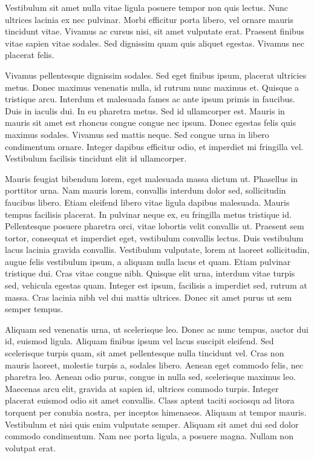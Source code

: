 \documentclass[a4paper,10pt,twoside]{article} %
\begin{document}
Vestibulum sit amet nulla vitae ligula posuere tempor non quis lectus.
Nunc ultrices lacinia ex nec pulvinar.
Morbi efficitur porta libero, vel ornare mauris tincidunt vitae.
Vivamus ac cursus nisi, sit amet vulputate erat.
Praesent finibus vitae sapien vitae sodales.
Sed dignissim quam quis aliquet egestas.
Vivamus nec placerat felis.

Vivamus pellentesque dignissim sodales.
Sed eget finibus ipsum, placerat ultricies metus.
Donec maximus venenatis nulla, id rutrum nunc maximus et.
Quisque a tristique arcu.
Interdum et malesuada fames ac ante ipsum primis in faucibus.
Duis in iaculis dui.
In eu pharetra metus.
Sed id ullamcorper est.
Mauris in mauris sit amet est rhoncus congue congue nec ipsum.
Donec egestas felis quis maximus sodales.
Vivamus sed mattis neque.
Sed congue urna in libero condimentum ornare.
Integer dapibus efficitur odio, et imperdiet mi fringilla vel.
Vestibulum facilisis tincidunt elit id ullamcorper.

Mauris feugiat bibendum lorem, eget malesuada massa dictum ut.
Phasellus in porttitor urna.
Nam mauris lorem, convallis interdum dolor sed, sollicitudin faucibus libero.
Etiam eleifend libero vitae ligula dapibus malesuada.
Mauris tempus facilisis placerat.
In pulvinar neque ex, eu fringilla metus tristique id.
Pellentesque posuere pharetra orci, vitae lobortis velit convallis ut.
Praesent sem tortor, consequat et imperdiet eget, vestibulum convallis lectus.
Duis vestibulum lacus lacinia gravida convallis.
Vestibulum vulputate, lorem at laoreet sollicitudin, augue felis vestibulum ipsum, a aliquam nulla lacus et quam.
Etiam pulvinar tristique dui.
Cras vitae congue nibh.
Quisque elit urna, interdum vitae turpis sed, vehicula egestas quam.
Integer est ipsum, facilisis a imperdiet sed, rutrum at massa.
Cras lacinia nibh vel dui mattis ultrices.
Donec sit amet purus ut sem semper tempus.

Aliquam sed venenatis urna, ut scelerisque leo.
Donec ac nunc tempus, auctor dui id, euismod ligula.
Aliquam finibus ipsum vel lacus suscipit eleifend.
Sed scelerisque turpis quam, sit amet pellentesque nulla tincidunt vel.
Cras non mauris laoreet, molestie turpis a, sodales libero.
Aenean eget commodo felis, nec pharetra leo.
Aenean odio purus, congue in nulla sed, scelerisque maximus leo.
Maecenas arcu elit, gravida at sapien id, ultrices commodo turpis.
Integer placerat euismod odio sit amet convallis.
Class aptent taciti sociosqu ad litora torquent per conubia nostra, per inceptos himenaeos.
Aliquam at tempor mauris.
Vestibulum et nisi quis enim vulputate semper.
Aliquam sit amet dui sed dolor commodo condimentum.
Nam nec porta ligula, a posuere magna.
Nullam non volutpat erat.
\end{document}
